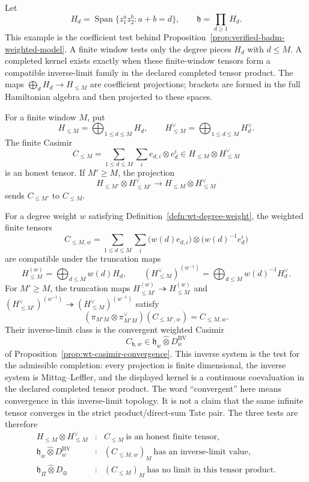 \begin{ex}
\label{ex:completion-toy-casimir}
Let
\[
  H_d=\operatorname{Span}\{z_1^az_2^b:a+b=d\},\qquad
  \mathfrak h=\prod_{d\ge1}H_d .
\]
This example is the coefficient test behind
Proposition~\ref{prop:verified-badm-weighted-model}.  A finite window
tests only the degree pieces \(H_d\) with \(d\le M\).  A completed
kernel exists exactly when these finite-window tensors form a compatible
inverse-limit family in the declared completed tensor product.  The
maps \(\bigoplus_dH_d\to H_{\leq M}\) are coefficient projections;
brackets are formed in the full Hamiltonian algebra and then
projected to these spaces.

For a finite window \(M\), put
\[
  H_{\le M}=\bigoplus_{1\le d\le M}H_d,\qquad
  H_{\le M}^{\vee}=\bigoplus_{1\le d\le M}H_d^\vee .
\]
The finite Casimir
\[
  C_{\le M}=\sum_{1\le d\le M}\sum_i e_{d,i}\otimes e^i_d
  \in H_{\le M}\otimes H_{\le M}^{\vee}
\]
is an honest tensor.  If \(M'\ge M\), the projection
\[
  H_{\le M'}\otimes H_{\le M'}^\vee
  \longrightarrow
  H_{\le M}\otimes H_{\le M}^\vee
\]
sends \(C_{\le M'}\) to \(C_{\le M}\).

For a degree weight \(w\) satisfying
Definition~\ref{defn:wt-degree-weight}, the weighted finite tensors
\[
  C_{\le M,w}
  =
  \sum_{1\le d\le M}\sum_i
  \bigl(w(d)e_{d,i}\bigr)\otimes
  \bigl(w(d)^{-1}e^i_d\bigr)
\]
are compatible under the truncation maps
\[
  H_{\le M}^{(w)}=\bigoplus_{d\le M}w(d)H_d,\qquad
  (H_{\le M}^{\vee})^{(w^{-1})}
    =\bigoplus_{d\le M}w(d)^{-1}H_d^\vee .
\]
For \(M'\ge M\), the truncation maps
\(H_{\le M'}^{(w)}\twoheadrightarrow H_{\le M}^{(w)}\) and
\((H_{\le M'}^\vee)^{(w^{-1})}\twoheadrightarrow
(H_{\le M}^\vee)^{(w^{-1})}\) satisfy
\[
  (\pi_{M'M}\otimes\pi^\vee_{M'M})(C_{\le M',w})=C_{\le M,w}.
\]
Their inverse-limit class is the convergent weighted Casimir
\[
  C_{\mathfrak h,w}\in
  \mathfrak h_w\widehat\otimes
  D^{\mathrm{BV}}_w
\]
of Proposition~\ref{prop:wt-casimir-convergence}.  This inverse system
is the test for the admissible completion: every projection is finite
dimensional, the inverse system is Mittag--Leffler, and the displayed
kernel is a continuous coevaluation in the declared completed tensor
product.  The word ``convergent'' here means convergence in this
inverse-limit topology.  It is not a claim that the same infinite tensor
converges in the strict product/direct-sum Tate pair.  The three tests
are therefore
\[
\begin{array}{rcl}
  H_{\le M}\otimes H_{\le M}^{\vee}
  &:&
  C_{\le M}\ \text{is an honest finite tensor},\\[2mm]
  \mathfrak h_w\widehat\otimes
  D^{\mathrm{BV}}_w
  &:&
  (C_{\le M,w})_M\ \text{has an inverse-limit value},\\[2mm]
  \mathfrak h_\Pi\widehat\otimes D_\oplus
  &:&
  (C_{\le M})_M\ \text{has no limit in this tensor product}.
\end{array}
\]


\end{ex}
